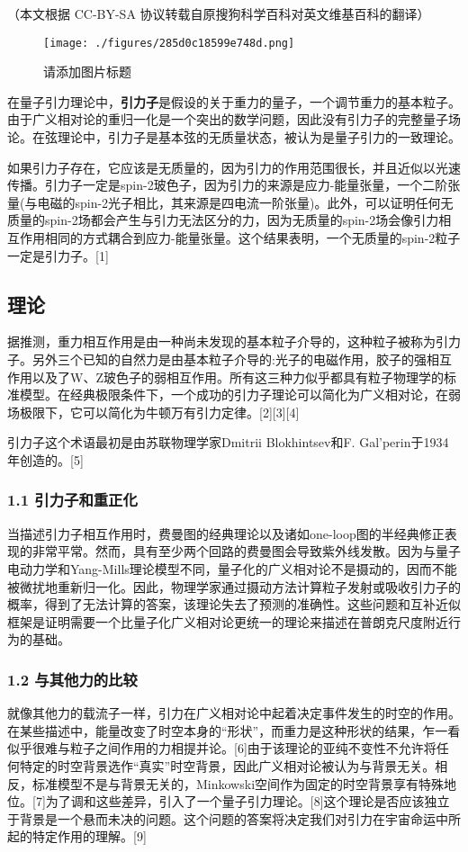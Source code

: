 
（本文根据 CC-BY-SA 协议转载自原搜狗科学百科对英文维基百科的翻译）

\begin{figure}[ht]
\centering
\texttt{[image: ./figures/285d0c18599e748d.png]}
\caption{请添加图片标题} \label{fig_YLZ_1}
\end{figure}

在量子引力理论中，\textbf{引力子}是假设的关于重力的量子，一个调节重力的基本粒子。由于广义相对论的重归一化是一个突出的数学问题，因此没有引力子的完整量子场论。在弦理论中，引力子是基本弦的无质量状态，被认为是量子引力的一致理论。

如果引力子存在，它应该是无质量的，因为引力的作用范围很长，并且近似以光速传播。引力子一定是spin-2玻色子，因为引力的来源是应力-能量张量，一个二阶张量(与电磁的spin-2光子相比，其来源是四电流一阶张量)。此外，可以证明任何无质量的spin-2场都会产生与引力无法区分的力，因为无质量的spin-2场会像引力相互作用相同的方式耦合到应力-能量张量。这个结果表明，一个无质量的spin-2粒子一定是引力子。[1]

\subsection{理论}
据推测，重力相互作用是由一种尚未发现的基本粒子介导的，这种粒子被称为引力子。另外三个已知的自然力是由基本粒子介导的:光子的电磁作用，胶子的强相互作用以及了W、Z玻色子的弱相互作用。所有这三种力似乎都具有粒子物理学的标准模型。在经典极限条件下，一个成功的引力子理论可以简化为广义相对论，在弱场极限下，它可以简化为牛顿万有引力定律。[2][3][4]

引力子这个术语最初是由苏联物理学家Dmitrii Blokhintsev和F. Gal'perin于1934年创造的。[5]

\subsubsection{1.1 引力子和重正化}
当描述引力子相互作用时，费曼图的经典理论以及诸如one-loop图的半经典修正表现的非常平常。然而，具有至少两个回路的费曼图会导致紫外线发散。因为与量子电动力学和Yang-Mills理论模型不同，量子化的广义相对论不是摄动的，因而不能被微扰地重新归一化。因此，物理学家通过摄动方法计算粒子发射或吸收引力子的概率，得到了无法计算的答案，该理论失去了预测的准确性。这些问题和互补近似框架是证明需要一个比量子化广义相对论更统一的理论来描述在普朗克尺度附近行为的基础。

\subsubsection{1.2 与其他力的比较}
就像其他力的载流子一样，引力在广义相对论中起着决定事件发生的时空的作用。在某些描述中，能量改变了时空本身的“形状”，而重力是这种形状的结果，乍一看似乎很难与粒子之间作用的力相提并论。[6]由于该理论的亚纯不变性不允许将任何特定的时空背景选作“真实”时空背景，因此广义相对论被认为与背景无关。相反，标准模型不是与背景无关的，Minkowski空间作为固定的时空背景享有特殊地位。[7]为了调和这些差异，引入了一个量子引力理论。[8]这个理论是否应该独立于背景是一个悬而未决的问题。这个问题的答案将决定我们对引力在宇宙命运中所起的特定作用的理解。[9]


